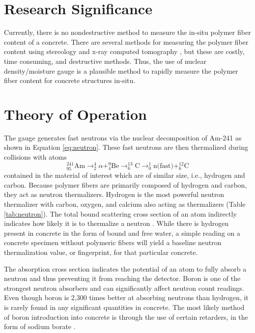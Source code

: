 \documentclass[9pt,twocolumn,twoside]{iscp}
\begin{document}
\section{Research Significance}

Currently, there is no nondestructive method to measure the in-situ polymer fiber content of a concrete. There are several methods for measuring the polymer fiber content using stereology and x-ray computed tomography \citep{and2005a, p2000a, c2011a}, but these are costly, time consuming, and destructive methods. Thus, the use of nuclear density/moisture gauge is a plausible method to rapidly measure the polymer fiber content for concrete structures in-situ.

\section{Theory of Operation}
The gauge generates fast neutrons via the nuclear decomposition of Am-241 as shown in Equation \ref{eq:neutron}. These fast neutrons are then thermalized during collisions with atoms
\begin{equation}
    \label{eq:neutron}
    _{95}^{241}\textrm{Am}\rightarrow _{2}^{4}\alpha + _{4}^{9}\textrm{Be}\rightarrow _{6}^{13}\textrm{C}\rightarrow _{0}^{1}\textrm{n(fast)} + _{6}^{12}\textrm{C}
\end{equation}
contained in the material of interest which are of similar size, i.e., hydrogen and carbon. Because polymer fibers are primarily composed of hydrogen and carbon, they act as neutron thermalizers. Hydrogen is the most powerful neutron thermalizer with carbon, oxygen, and calcium also acting as thermalizers (Table \ref{tab:neutron}). The total bound scattering cross section of an atom indirectly indicates how likely it is to thermalize a neutron \citep{and1971a,foderaro1971a}. While there is hydrogen present in concrete in the form of bound and free water, a simple reading on a concrete specimen without polymeric fibers will yield a baseline neutron thermalization value, or fingerprint, for that particular concrete.

The absorption cross section indicates the potential of an atom to fully absorb
a neutron and thus preventing it from reaching the detector. Boron is one of the strongest neutron absorbers and can significantly affect neutron count readings. Even though boron is 2,300 times better at absorbing neutrons than hydrogen, it is rarely found in any significant quantities in concrete. The most likely method of boron introduction into concrete is through the use of certain retarders, in the form of sodium borate \citep{s2003a}.
\end{document}
